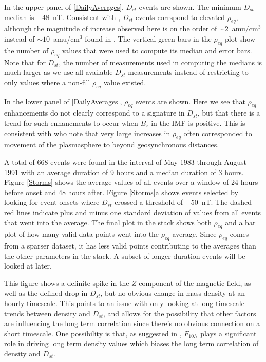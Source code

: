 \documentclass[10pt,twocolumn]{article}
\begin{document}
In the upper panel of \ref{DailyAverages}, $D_{st}$ events are shown.  The minimum $D_{st}$ median is $-48$~nT.  Consistent with \cite{Takahashi2010}, $D_{st}$ events corrspond to elevated $\rho_{eq}$, although the magnitude of increase observed here is on the order of $\sim2$~amu/cm$^3$ instead of $\sim10$~amu/cm$^3$ found in \cite{Takahashi2010}.  The vertical green bars in the $\rho_{eq}$ plot show the number of $\rho_{eq}$ values that were used to compute its median and error bars.  Note that for $D_{st}$, the number of measurements used in computing the medians is much larger as we use all available $D_{st}$ measurements instead of restricting to only values where a non-fill $\rho_{eq}$ value existed.  

In the lower panel of \ref{DailyAverages}, $\rho_{eq}$ events are shown.  Here we see that $\rho_{eq}$ enhancements do not clearly correspond to a signature in $D_{st}$, but that there is a trend for such enhancments to occur when $B_{z}$ in the IMF is positive.  This is consistent with \cite{Takahashi2010} who note that very large increases in $\rho_{eq}$ often corresponded to movement of the plasmasphere to beyond geosynchronous distances. 

A total of 668 events were found in the interval of May 1983 through August 1991 with an average duration of 9 hours and a median duration of 3 hours. Figure \ref{Storms} shows the average values of all events over a window of 24 hours before onset and 48 hours after. Figure \ref{Storms}a shows events selected by looking for event onsets where $D_{st}$ crossed a threshold of $-50$~nT. The dashed red lines indicate plus and minus one standard deviation of values from all events that went into the average. The final plot in the stack shows both $\rho_{eq}$ and a bar plot of how many valid data points went into the $\rho_{eq}$ average. Since $\rho_{eq}$ comes from a sparser dataset, it has less valid points contributing to the averages than the other parameters in the stack. A subset of longer duration events will be looked at later. 

This figure shows a definite spike in the $Z$ component of the magnetic field, as well as the defined drop in $D_{st}$, but no obvious change in mass density at an hourly timescale. This points to an issue with only looking at long-timescale trends between density and $D_{st}$, and allows for the possibility that other factors are influencing the long term correlation since there's no obvious connection on a short timescale. One possibility is that, as suggested in \cite{Takahashi2010}, $F_{10.7}$ plays a significant role in driving long term density values which biases the long term correlation of density and $D_{st}$.
\end{document}

